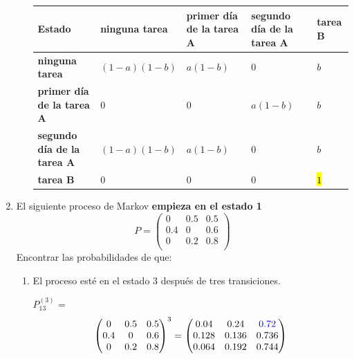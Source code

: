 \documentclass{templateNote}
\begin{document}
\begin{enumerate}[start = 3]
\begin{enumerate}[label = \alph*)]
\begin{center}
            \begin{table}[h]
                \centering
                \begin{tabularx}{\textwidth}{|X|X|X|X|X|}
                    \hline
                    \textbf{Estado} & \textbf{ninguna tarea} & \textbf{primer día de la tarea A} & \textbf{segundo día de la tarea A} & \textbf{tarea B} \\ \hline
                    \textbf{ninguna tarea} & $(1-a)(1-b)$ & $a(1-b)$ & $0$ & $b$ \\ \hline
                    \textbf{primer día de la tarea A} & $0$ & $0$ & $a(1-b)$ & $b$ \\ \hline
                    \textbf{segundo día de la tarea A} & $(1-a)(1-b)$ & $a(1-b)$ & $0$ & $b$ \\ \hline
                    \textbf{tarea B} & $0$ & $0$ & $0$ & \hl{$1$}\\ \hline
                \end{tabularx}
            \end{table}

        \end{center}

        
    
    \end{enumerate}

    \newpage
    \item El siguiente proceso de Markov \textbf{empieza en el estado 1}
    \[
    P = \begin{pmatrix}
        0   & 0.5 & 0.5 \\
        0.4 & 0   & 0.6 \\
        0   & 0.2 & 0.8 \\
    \end{pmatrix}
    \]
    Encontrar las probabilidades de que:
    \begin{enumerate}[label=\alph*)]
        \item El proceso esté en el estado 3 después de tres transiciones.

        $P_{13}^{(3)}$ = 
        \[
        \begin{pmatrix}
            0   & 0.5 & 0.5 \\
            0.4 & 0   & 0.6 \\
            0   & 0.2 & 0.8 \\
        \end{pmatrix}^3
        =
        \begin{pmatrix}
            0.04 & 0.24 & \textcolor{blue}{0.72} \\
            0.128 & 0.136 & 0.736 \\ 
            0.064 & 0.192 & 0.744 \\
        \end{pmatrix}
        \]


\end{enumerate}
\end{enumerate}
\end{document}
